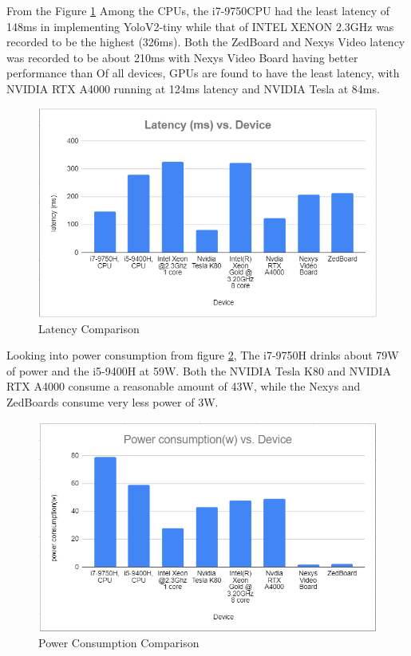 \documentclass[a4paper,12pt,oneside]{book}
\begin{document}
From the Figure \ref{figure:compare-hardware} Among the CPUs, the i7-9750CPU had the least latency of 148ms in implementing YoloV2-tiny while  that of INTEL XENON 2.3GHz was recorded to be the highest (326ms). Both the ZedBoard and Nexys Video latency was recorded to be about 210ms with Nexys Video Board having better performance than Of all devices, GPUs are found to have the least latency, with NVIDIA RTX A4000 running at 124ms latency and NVIDIA Tesla at 84ms.
\begin{figure}[h!]
    \centering
    \includegraphics[scale=0.38]{images/hardware-performance.png}
    \caption{Latency Comparison}
    \label{figure:compare-hardware}
\end{figure}

Looking into power consumption from figure \ref{figure:compare-power}, The i7-9750H drinks about 79W of power and the i5-9400H at 59W.
Both the NVIDIA Tesla K80 and NVIDIA RTX A4000 consume a reasonable amount of 43W,
while the Nexys and ZedBoards consume very less power of 3W.

\begin{figure}[h!]
    \centering
    \includegraphics[scale=0.38]{images/power-consumption.png}
    \caption{Power Consumption Comparison}
    \label{figure:compare-power}
\end{figure}
\end{document}
